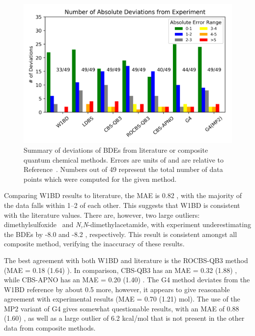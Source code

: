 \begin{figure}[htb]
  \centering
  \includegraphics[width=\textwidth]{figures/bde-barchart}
  \caption[Summary of deviations of BDEs from literature for composite quantum chemical methods.]{Summary of deviations of BDEs from literature or composite quantum chemical methods. Errors are units of \kcalmol and are relative to Reference~\protect{}. Numbers out of 49 represent the total number of data points which were computed for the given method.}
  \label{fig:maebarchart}
\end{figure}

Comparing W1BD results to literature, the MAE is 0.82 \kcalmol, with the majority of the data falls within 1--2 \kcalmol of each other. This suggests that W1BD is consistent with the literature values. There are, however, two large outliers: dimethylsulfoxide\footnotemark~ and \emph{N,N}-dimethylacetamide, with experiment underestimating the BDEs by -8.0 and -8.2 \kcalmol, respectively. This result is consistent amongst all composite method, verifying the inaccuracy of these results.


The best agreement with both W1BD and literature is the ROCBS-QB3 method (MAE = 0.18 (1.64) \kcalmol). In comparison, CBS-QB3 has an MAE = 0.32 (1.88) \kcalmol, while CBS-APNO has an MAE = 0.20 (1.40) \kcalmol.  The G4 method deviates from the W1BD reference by about 0.5 \kcalmol more, however, it appears to give reasonable agreement with experimental results (MAE = 0.70 (1.21) mol). The use of the MP2 variant of G4 gives somewhat questionable results, with an MAE of 0.88 (1.60) \kcalmol, as well as a large outlier of 6.2 kcal/mol that is not present in the other data from composite methods.

